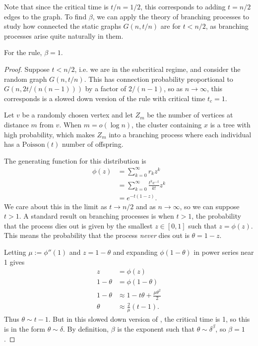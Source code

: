 \documentclass[twoside,10pt]{article}
\newcommand{\poisson}{\text{Poisson}}
\begin{document}
Note that since the critical time is $t/n = 1/2$, this corresponds to adding $t=n/2$ edges to the graph. To find $\beta$, we can apply the theory of branching processes to study how connected the static graphs $G(n,t/n)$ are for $t < n/2$, as branching processes arise quite naturally in them.

\begin{thrm}[]
For the \ER rule, $\beta=1$.
\end{thrm}
\begin{proof}
	Suppose $t<n/2$, i.e. we are in the subcritical regime, and consider the \ER random graph $G(n,t/n)$. This has connection probability proportional to $G(n, 2t/(n (n-1)))$ by a factor of $2/(n-1)$, so as $n\to \infty$, this corresponds is a slowed down version of the \ER rule with critical time $t_{c}=1$.

	Let $v$ be a randomly chosen vertex and let $Z_{m}$ be the number of vertices at distance $m$ from $v$. When $m=o(\log n)$, the cluster containing $x$ is a tree with high probability, which makes $Z_{m}$ into a branching process where each individual has a $\poisson(t)$ number of offspring.

	The generating function for this distribution is
	\begin{align*}
		\phi(z) &= \sum_{k=0}^{\infty} r_{k}z^{k} \\
			&= \sum_{k=0}^{\infty} \frac{t^{k} e^{-t}}{k!} z^{k} \\
			&= e^{-t(1-z)}.
	\end{align*}
	We care about this in the limit as $t\to n/2$ and as $n\to \infty$, so we can suppose $t>1$. A standard result on branching processes is when $t>1$, the probability that the process dies out is given by the smallest $z \in [0,1]$ such that $z = \phi(z)$. This means the probability that the process \textit{never} dies out is $\theta = 1-z$.

	Letting $\mu := \phi''(1)$ and $z=1-\theta$ and expanding $\phi(1-\theta)$ in power series near 1 gives
	\begin{align*}
		z &= \phi(z) \\
		1-\theta &= \phi(1-\theta) \\
		1-\theta &\approx 1-t\theta + \frac{\mu\theta^{2}}{2} \\
		\theta &\approx \frac{2}{\mu} (t-1).
	\end{align*}
	Thus $\theta \sim t-1$. But in this slowed down version of \ER, the critical time is 1, so this is in the form $\theta \sim \delta$. By definition, $\beta$ is the exponent such that $\theta \sim \delta^{\beta}$, so $\beta=1$.
\end{proof}
\end{document}

